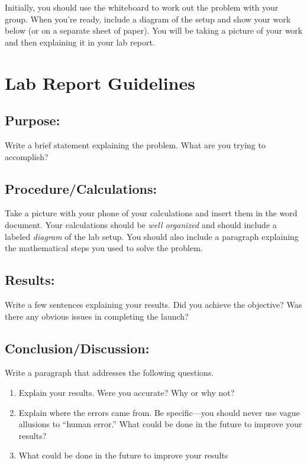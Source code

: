 \documentclass[10pt]{exam}
\begin{document}
Initially, you should use the whiteboard to work out the problem with your group.  When you're ready, include a diagram of the setup and show your work below (or on a separate sheet of paper).  You will be taking a picture of your work and then explaining it in your lab report.

\pagebreak


\section*{Lab Report Guidelines}

\subsection*{Purpose:}  
Write a brief statement explaining the problem.  What are you trying to accomplish?


\subsection*{Procedure/Calculations:}
Take a picture with your phone of your calculations and insert them in the word document.  Your calculations should be \emph{well organized} and should include a labeled \emph{diagram} of the lab setup.  You should also include a paragraph explaining the mathematical steps you used to solve the problem.

\subsection*{Results:}
Write a few sentences explaining your results.  Did you achieve the objective?  Was there any obvious issues in completing the launch?

\subsection*{Conclusion/Discussion:}
Write a paragraph that addresses the following questions.

\begin{enumerate}
  \item Explain your results. Were you accurate?  Why or why not? 
  \item Explain where the errors came from.  Be specific—you should never use vague allusions to ``human error.''  What could be done in the future to improve your results?
  \item What could be done in the future to improve your results
\end{enumerate}
	
\end{document}
